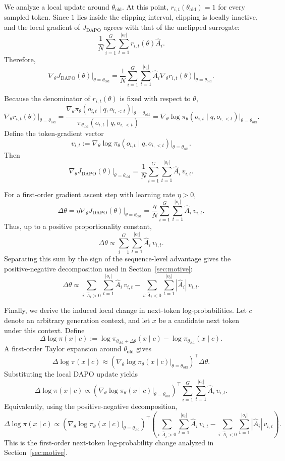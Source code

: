 \documentclass{llmxive}
\begin{document}
We analyze a local update around \(\theta_{\mathrm{old}}\). At this point,
\(r_{i,t}(\theta_{\mathrm{old}})=1\) for every sampled token. Since \(1\) lies
inside the clipping interval, clipping is locally inactive, and the local
gradient of \(J_{\mathrm{DAPO}}\) agrees with that of the unclipped surrogate:
\[
\frac{1}{N}
\sum_{i=1}^G \sum_{t=1}^{|o_i|}
r_{i,t}(\theta)\hat A_i.
\]
Therefore,
\[
\nabla_\theta J_{\mathrm{DAPO}}(\theta)\Big|_{\theta=\theta_{\mathrm{old}}}
=
\frac{1}{N}
\sum_{i=1}^G \sum_{t=1}^{|o_i|}
\hat A_i
\nabla_\theta r_{i,t}(\theta)\Big|_{\theta=\theta_{\mathrm{old}}}.
\]

Because the denominator of \(r_{i,t}(\theta)\) is fixed with respect to
\(\theta\),
\[
\nabla_\theta r_{i,t}(\theta)\Big|_{\theta=\theta_{\mathrm{old}}}
=
\frac{
\nabla_\theta \pi_\theta(o_{i,t}\mid q,o_{i,<t})
\big|_{\theta=\theta_{\mathrm{old}}}
}{
\pi_{\theta_{\mathrm{old}}}(o_{i,t}\mid q,o_{i,<t})
}
=
\nabla_\theta
\log \pi_\theta(o_{i,t}\mid q,o_{i,<t})
\Big|_{\theta=\theta_{\mathrm{old}}}.
\]
Define the token-gradient vector
\[
v_{i,t}
:=
\nabla_\theta
\log \pi_\theta(o_{i,t}\mid q,o_{i,<t})
\Big|_{\theta=\theta_{\mathrm{old}}}.
\]
Then
\[
\nabla_\theta J_{\mathrm{DAPO}}(\theta)\Big|_{\theta=\theta_{\mathrm{old}}}
=
\frac{1}{N}
\sum_{i=1}^G \sum_{t=1}^{|o_i|}
\hat A_i\,v_{i,t}.
\]

For a first-order gradient ascent step with learning rate \(\eta>0\),
\[
\Delta\theta
=
\eta
\nabla_\theta J_{\mathrm{DAPO}}(\theta)\Big|_{\theta=\theta_{\mathrm{old}}}
=
\frac{\eta}{N}
\sum_{i=1}^G \sum_{t=1}^{|o_i|}
\hat A_i\,v_{i,t}.
\]
Thus, up to a positive proportionality constant,
\[
\Delta\theta
\propto
\sum_{i=1}^G \sum_{t=1}^{|o_i|}
\hat A_i\,v_{i,t}.
\]
Separating this sum by the sign of the sequence-level advantage gives the
positive-negative decomposition used in Section~\ref{sec:motive}:
\[
\Delta\theta
\propto
\sum_{i:\hat A_i>0}\sum_{t=1}^{|o_i|}
\hat A_i\,v_{i,t}
-
\sum_{i:\hat A_i<0}\sum_{t=1}^{|o_i|}
|\hat A_i|\,v_{i,t}.
\]

Finally, we derive the induced local change in next-token log-probabilities.
Let \(c\) denote an arbitrary generation context, and let \(x\) be a candidate
next token under this context. Define
\[
\Delta \log \pi(x\mid c)
:=
\log \pi_{\theta_{\mathrm{old}}+\Delta\theta}(x\mid c)
-
\log \pi_{\theta_{\mathrm{old}}}(x\mid c).
\]
A first-order Taylor expansion around \(\theta_{\mathrm{old}}\) gives
\[
\Delta \log \pi(x\mid c)
\approx
\left(
\nabla_\theta
\log \pi_\theta(x\mid c)
\Big|_{\theta=\theta_{\mathrm{old}}}
\right)^{\top}
\Delta\theta.
\]
Substituting the local DAPO update yields
\[
\Delta \log \pi(x\mid c)
\propto
\left(
\nabla_\theta
\log \pi_\theta(x\mid c)
\Big|_{\theta=\theta_{\mathrm{old}}}
\right)^{\top}
\sum_{i=1}^G \sum_{t=1}^{|o_i|}
\hat A_i\,v_{i,t}.
\]
Equivalently, using the positive-negative decomposition,
\[
\Delta \log \pi(x\mid c)
\propto
\left(
\nabla_\theta
\log \pi_\theta(x\mid c)
\Big|_{\theta=\theta_{\mathrm{old}}}
\right)^{\top}
\left(
\sum_{i:\hat A_i>0}\sum_{t=1}^{|o_i|}
\hat A_i\,v_{i,t}
-
\sum_{i:\hat A_i<0}\sum_{t=1}^{|o_i|}
|\hat A_i|\,v_{i,t}
\right).
\]
This is the first-order next-token log-probability change analyzed in Section~\ref{sec:motive}.
\end{document}
